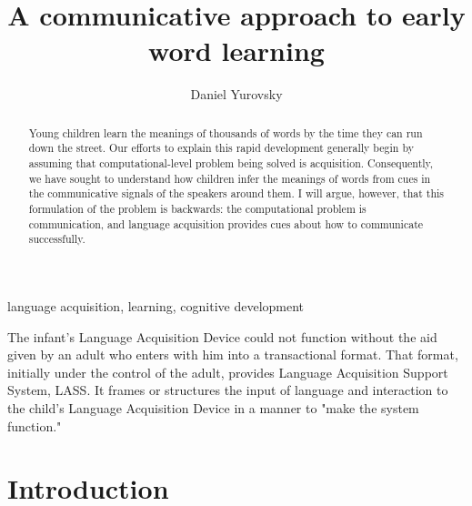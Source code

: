 \documentclass[review]{elsarticle}
\begin{document}
\begin{frontmatter}

\title{A communicative approach to early word learning}

\author{Daniel Yurovsky}
\address{Department of Psychology, University of Chicago, \\5848 S University Ave., Chicago, IL 60637, USA}

\begin{abstract}
Young children learn the meanings of thousands of words by the time they can run down the street. Our efforts to explain this rapid development generally begin by assuming that computational-level problem being solved is acquisition. Consequently, we have sought to understand how children infer the meanings of words from cues in the communicative signals of the speakers around them. I will argue, however, that this formulation of the problem is backwards: the computational problem is communication, and language acquisition provides cues about how to communicate successfully.
\end{abstract}

\begin{keyword}
language acquisition, learning, cognitive development
\end{keyword}

\end{frontmatter}

\linenumbers
\renewcommand{\epigraphwidth}{\textwidth}

\epigraph{The infant's Language Acquisition Device could not function without the aid given by an adult who enters with him into a transactional format. That format, initially under the control of the adult, provides  Language Acquisition Support System, LASS. It frames or structures the input of language and interaction to the child's Language Acquisition Device in a manner to "make the system function."}{\cite{bruner1983}}


\section{Introduction}
\end{document}
